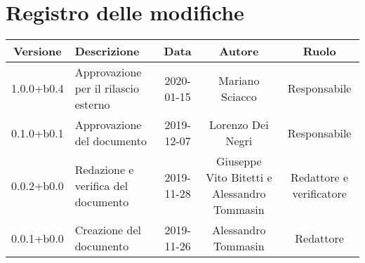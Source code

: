 \section*{Registro delle modifiche}

\begin{center}
	\begin{longtable}{|c|p{3cm}|c|c|c|}
	\hline
	\rowcolor{lighter-grayer}
	\textbf{Versione} & \textbf{Descrizione} & \textbf{Data} & \textbf{Autore} & \textbf{Ruolo} \\
	\hline
	\endfirsthead


	1.0.0+b0.4 & Approvazione per il rilascio esterno & 2020-01-15 & Mariano Sciacco & Responsabile \\
	\hline
	0.1.0+b0.1 & Approvazione del documento & 2019-12-07 & Lorenzo Dei Negri & Responsabile \\
	\hline
	0.0.2+b0.0 & Redazione e verifica del documento & 2019-11-28 & Giuseppe Vito Bitetti e Alessandro Tommasin & Redattore e verificatore \\
	\hline
	0.0.1+b0.0 & Creazione del documento & 2019-11-26 & Alessandro Tommasin & Redattore \\
	\hline

	\end{longtable}
\end{center}
